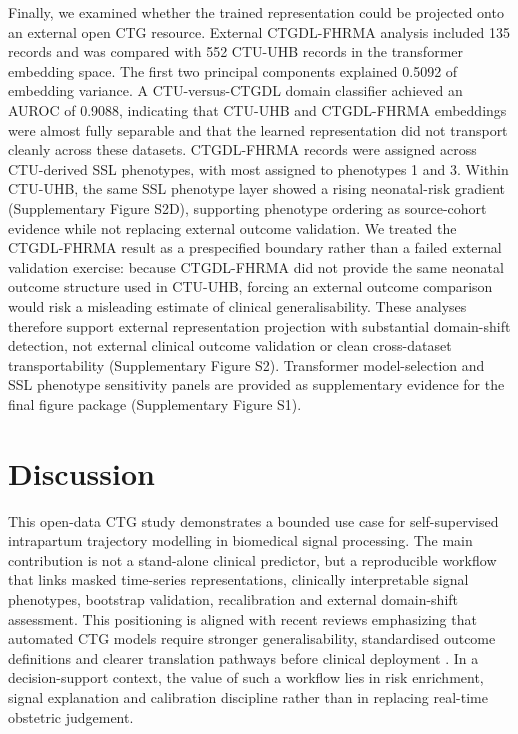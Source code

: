 \documentclass[utf8]{FrontiersinHarvard}
\begin{document}
Finally, we examined whether the trained representation could be projected onto an external open CTG resource. External CTGDL-FHRMA analysis included 135 records and was compared with 552 CTU-UHB records in the transformer embedding space. The first two principal components explained 0.5092 of embedding variance. A CTU-versus-CTGDL domain classifier achieved an AUROC of 0.9088, indicating that CTU-UHB and CTGDL-FHRMA embeddings were almost fully separable and that the learned representation did not transport cleanly across these datasets. CTGDL-FHRMA records were assigned across CTU-derived SSL phenotypes, with most assigned to phenotypes 1 and 3. Within CTU-UHB, the same SSL phenotype layer showed a rising neonatal-risk gradient (Supplementary Figure S2D), supporting phenotype ordering as source-cohort evidence while not replacing external outcome validation. We treated the CTGDL-FHRMA result as a prespecified boundary rather than a failed external validation exercise: because CTGDL-FHRMA did not provide the same neonatal outcome structure used in CTU-UHB, forcing an external outcome comparison would risk a misleading estimate of clinical generalisability. These analyses therefore support external representation projection with substantial domain-shift detection, not external clinical outcome validation or clean cross-dataset transportability (Supplementary Figure S2). Transformer model-selection and SSL phenotype sensitivity panels are provided as supplementary evidence for the final figure package (Supplementary Figure S1).

\section{Discussion}

This open-data CTG study demonstrates a bounded use case for self-supervised intrapartum trajectory modelling in biomedical signal processing. The main contribution is not a stand-alone clinical predictor, but a reproducible workflow that links masked time-series representations, clinically interpretable signal phenotypes, bootstrap validation, recalibration and external domain-shift assessment. This positioning is aligned with recent reviews emphasizing that automated CTG models require stronger generalisability, standardised outcome definitions and clearer translation pathways before clinical deployment \citep{mendis2023,francis2024}. In a decision-support context, the value of such a workflow lies in risk enrichment, signal explanation and calibration discipline rather than in replacing real-time obstetric judgement.
\end{document}
